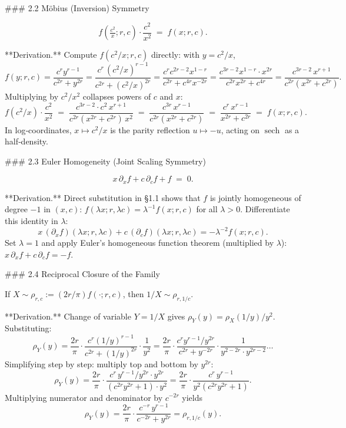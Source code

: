### 2.2 Möbius (Inversion) Symmetry

$$
\boxed{\;f\!\left(\tfrac{c^{2}}{x};r,c\right)\cdot\frac{c^{2}}{x^{2}}\;=\;f(x;r,c).\;}
$$

**Derivation.** Compute $f(c^{2}/x;r,c)$ directly: with $y=c^{2}/x$,
$$
f(y;r,c) = \frac{c^{r}y^{r-1}}{c^{2r}+y^{2r}} = \frac{c^{r}\,(c^{2}/x)^{r-1}}{c^{2r}+(c^{2}/x)^{2r}} = \frac{c^{r}c^{2r-2}x^{1-r}}{c^{2r}+c^{4r}x^{-2r}} = \frac{c^{3r-2}x^{1-r}\cdot x^{2r}}{c^{2r}x^{2r}+c^{4r}} = \frac{c^{3r-2}\,x^{r+1}}{c^{2r}(x^{2r}+c^{2r})}.
$$
Multiplying by $c^{2}/x^{2}$ collapses powers of $c$ and $x$:
$$
f(c^{2}/x)\cdot\frac{c^{2}}{x^{2}} \;=\; \frac{c^{3r-2}\cdot c^{2}\,x^{r+1}}{c^{2r}(x^{2r}+c^{2r})\,x^{2}} \;=\; \frac{c^{3r}\,x^{r-1}}{c^{2r}(x^{2r}+c^{2r})} \;=\; \frac{c^{r}\,x^{r-1}}{x^{2r}+c^{2r}} \;=\; f(x;r,c).
$$
In log‑coordinates, $x\mapsto c^{2}/x$ is the parity reflection $u\mapsto -u$, acting on $\operatorname{sech}$ as a half‑density.

### 2.3 Euler Homogeneity (Joint Scaling Symmetry)

$$
x\,\partial_{x}f + c\,\partial_{c}f + f \;=\; 0.
$$

**Derivation.** Direct substitution in §1.1 shows that $f$ is jointly homogeneous of degree $-1$ in $(x,c)$: $f(\lambda x;r,\lambda c) = \lambda^{-1}f(x;r,c)$ for all $\lambda>0$. Differentiate this identity in $\lambda$:
$$
x\,(\partial_{x}f)(\lambda x;r,\lambda c) + c\,(\partial_{c}f)(\lambda x;r,\lambda c) = -\lambda^{-2}f(x;r,c).
$$
Set $\lambda=1$ and apply Euler's homogeneous function theorem (multiplied by $\lambda$): $x\,\partial_{x}f + c\,\partial_{c}f = -f$.

### 2.4 Reciprocal Closure of the Family

If $X\sim\rho_{r,c}:=(2r/\pi)f(\cdot;r,c)$, then $1/X\sim\rho_{r,1/c}$.

**Derivation.** Change of variable $Y=1/X$ gives $\rho_{Y}(y) = \rho_{X}(1/y)/y^{2}$. Substituting:
$$
\rho_{Y}(y) = \frac{2r}{\pi}\cdot\frac{c^{r}(1/y)^{r-1}}{c^{2r}+(1/y)^{2r}}\cdot\frac{1}{y^{2}} = \frac{2r}{\pi}\cdot\frac{c^{r}y^{r-1}/y^{2r}}{c^{2r}+y^{-2r}}\cdot\frac{1}{y^{2-2r}\cdot y^{2r-2}}\ldots
$$
Simplifying step by step: multiply top and bottom by $y^{2r}$:
$$
\rho_{Y}(y) = \frac{2r}{\pi}\cdot\frac{c^{r}\,y^{r-1}/y^{2r}\cdot y^{2r}}{(c^{2r}y^{2r}+1)\cdot y^{2}} = \frac{2r}{\pi}\cdot\frac{c^{r}\,y^{r-1}}{y^{2}(c^{2r}y^{2r}+1)}.
$$
Multiplying numerator and denominator by $c^{-2r}$ yields
$$
\rho_{Y}(y) = \frac{2r}{\pi}\cdot\frac{c^{-r}\,y^{r-1}}{c^{-2r}+y^{2r}} = \rho_{r,1/c}(y).
$$

